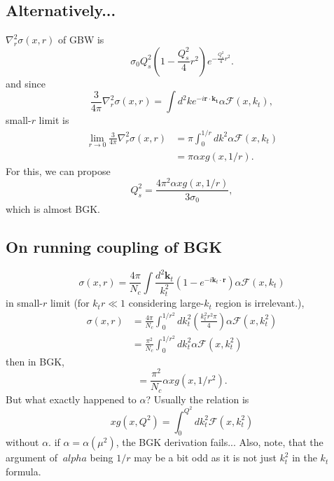 \documentclass[12pt]{article}
\begin{document}
\subsection{Alternatively...}
$\nabla^2_r\sigma(x,r)$
 of GBW is 
\begin{equation}
\sigma_0 Q_s^2 \left(1-\frac{Q_s^2}{4}r^2\right)e^{-\frac{Q_s^2}{4}r^2}.
\end{equation}
and since
\begin{equation}
	\frac{3}{4\pi} \nabla^2_r\sigma(x,r)=\int d^2ke^{-i\mathbf{r}\cdot\mathbf{k_t}}\alpha \mathcal{F}(x,k_t),
\end{equation}
small-$r$ limit is
\begin{equation}
\begin{split}
	\lim_{r\rightarrow0}\frac{3}{4\pi} \nabla^2_r\sigma(x,r)&=\pi \int^{1/r}_0 dk^2\alpha \mathcal{F}(x,k_t)\\
&=\pi \alpha xg(x,1/r).
\end{split}
\end{equation}
For this, we can propose
\begin{equation}
Q_s^2=\frac{4\pi^2 \alpha x g(x,1/r)}{3\sigma_0},
\end{equation}
which is almost BGK. 

\subsection{On running coupling of BGK}
\begin{equation}
\sigma(x,r)=\frac{4\pi}{N_c}\int\frac{d^2\mathbf{k}_t}{k_t^2}\left(1-e^{-i\mathbf{k}_t\cdot \mathbf{r}}\right)\alpha\mathcal{F}(x,k_t)
\end{equation}
in small-$r$ limit (for $k_t r\ll1$ considering large-$k_t$ region is irrelevant.), 
\begin{equation}
\begin{split}
\sigma(x,r)&=\frac{4\pi}{N_c}\int^{1/r^2}_0 dk^2_t\left(\frac{k_t^2r^2 \pi}{4}\right)\alpha\mathcal{F}(x,k_t^2)\\
&=\frac{\pi^2}{N_c}\int^{1/r^2}_0 dk^2_t \alpha\mathcal{F}(x,k_t^2)
\end{split}
\end{equation}
then in BGK,
\begin{equation}
=\frac{\pi^2}{N_c}\alpha xg(x,1/r^2).
\end{equation}
But what exactly happened to $\alpha$? 
Usually the relation is 
\begin{equation}
xg(x,Q^2)=\int^{Q^2}_0 d k^2_t \mathcal{F}(x,k_t^2)
\end{equation}
without $\alpha$. 
if $\alpha=\alpha(\mu^2)$, the BGK derivation fails...
Also, note, that the argument of $\
alpha$ being $1/r$ may be a bit odd as it is not just $k^2_t$ in the $k_t$ formula.
\end{document}

